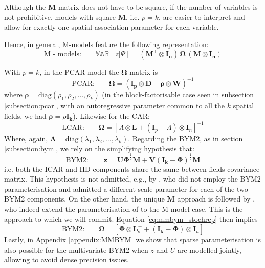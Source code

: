 \documentclass[openany, 11pt, oneside]{book}
\begin{document}
Although the $\boldsymbol{M}$ matrix does not have to be square, if the number of variables is not prohibitive, models with square $\boldsymbol{M}$, i.e. $p=k$, are easier to interpret and allow for exactly one spatial association parameter for each variable. 

Hence, in general, M-models feature the following representation:
\begin{equation}
   \text{M - models:} \quad \quad 
    \mathbb{VAR} \ \left[z \vert \Psi\right] =
    \left( \boldsymbol{M ^\top } \otimes\boldsymbol{ I_{n}} \right)
    \, \boldsymbol{\Omega} \,
    \left( \boldsymbol{M } \otimes\boldsymbol{ I_{n}} \right)
    \label{eq:M_models}
\end{equation}

With $p=k$, in the PCAR model the $\boldsymbol{\Omega}$ matrix is
%
$$
\text{PCAR:} \quad \quad 
\boldsymbol{\Omega}  = 
\left(\boldsymbol{I_p} \otimes \boldsymbol{D} - \boldsymbol{\rho} \otimes \boldsymbol{W} \right)^{-1}
$$
%
where $\boldsymbol{\rho} = \mathrm{diag}(\rho_1, \rho_2, \dots, \rho_k)$ (in the block-factorisable case seen in subsection \ref{subsection:pcar}, with an autoregressive parameter common to all the $k$ spatial fields, we had $\boldsymbol{\rho} = \rho \boldsymbol{I_k}$). Likewise for the CAR:
%
$$
\text{LCAR:} \quad \quad 
\boldsymbol{\Omega} =
 \left[ \Lambda \otimes \boldsymbol{L} + (\boldsymbol{I}_p - \Lambda) \otimes \boldsymbol{I}_n\right]^{-1} 
$$
%
Where, again, $\boldsymbol{\Lambda} = \mathrm{diag} \left(\lambda_1, \lambda_2, \dots, \lambda_k \right)$. Regarding the BYM2, as in section \ref{subsection:bym}, we rely on the simplifying hypothesis that:
%
\begin{equation}
\mathrm{BYM2}: \quad \quad
\boldsymbol{z} = \boldsymbol{U}\boldsymbol{ \Phi}^\frac{1}{2} \boldsymbol{M} + 
\boldsymbol{V} (\boldsymbol{I_k} -\boldsymbol{ \Phi})^\frac{1}{2} \boldsymbol{M}
\label{eq:mmbym_stochrep}
\end{equation}
%
i.e. both the ICAR and IID components share the same between-fields covariance matrix. This hypothesis is not admitted, e.g., by \cite{Corpas}, who did not employ the BYM2 parameterisation and admitted a different scale parameter for each of the two BYM2 components. On the other hand, the unique $\boldsymbol{M}$ approach is followed by \cite{Urdangarin24}, who indeed extend the parameterisation of \cite{BYM2} to the M-model case. This is the approach to which we will commit. Equation \ref{eq:mmbym_stochrep} then implies
%
\begin{equation}
    \text{BYM2:} \quad \quad
    \boldsymbol{\Omega} = 
 \left[ \boldsymbol{\Phi} \otimes \boldsymbol{L_s^+} + (\boldsymbol{I_k} - \boldsymbol{\Phi}) \otimes \boldsymbol{I}_n \right]
 \label{eq:mmbym}
\end{equation}
%
Lastly, in Appendix \ref{appendix:MMBYM} we show that sparse parameterisation is also possible for the multivariate BYM2 when $z$ and $U$ are modelled jointly, allowing to avoid dense precision issues.
\end{document}
